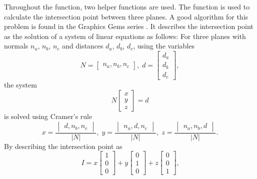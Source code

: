 Throughout the  function, two helper functions are used.
The  function is used to calculate the intersection point between three planes.
A good algorithm for this problem is found in the Graphics Gems series \cite[p304]{graphics_gems_1}.
It describes the intersection point as the solution of a system of linear equations as follows:
For three planes with normals $n_a$, $n_b$, $n_c$ and distances $d_a$, $d_b$, $d_c$, using the variables
\begin{equation*}
	N = \begin{bmatrix} n_a, n_b, n_c \end{bmatrix}, \;
	d = \begin{bmatrix} d_a \\ d_b \\ d_c \end{bmatrix},
\end{equation*}
the system
\begin{equation*}
N \begin{bmatrix} x \\ y \\ z \end{bmatrix} = d
\end{equation*}
is solved using Cramer's rule
\begin{equation*}
	x = \frac{\begin{vmatrix} d, n_b, n_c \end{vmatrix}}{|N|}, \;
	y = \frac{\begin{vmatrix} n_a, d, n_c \end{vmatrix}}{|N|}, \;
	z = \frac{\begin{vmatrix} n_a, n_b, d \end{vmatrix}}{|N|} \text{.}
\end{equation*}
By describing the intersection point as
\begin{equation*}
	I =
	x \begin{bmatrix} 1 \\ 0 \\ 0 \end{bmatrix} +
	y \begin{bmatrix} 0 \\ 1 \\ 0 \end{bmatrix} +
	z \begin{bmatrix} 0 \\ 0 \\ 1 \end{bmatrix} \text{,}
\end{equation*}

